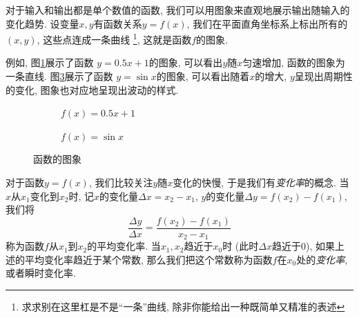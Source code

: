 对于输入和输出都是单个数值的函数,
我们可以用图象来直观地展示输出随输入的变化趋势.
设变量$x,y$有函数关系$y=f(x)$, 我们在平面直角坐标系上标出所有的$(x,y)$,
这些点连成一条曲线
\footnote{
  求求别在这里杠是不是``一条''曲线, 除非你能给出一种既简单又精准的表述\cndots
},
这就是函数$f$的图象.

例如, 图\ref{subfig:fig-test-line}展示了函数
$y=0.5x+1$的图象, 可以看出$y$随$x$匀速增加, 函数的图象为一条直线.
图\ref{subfig:fig-test-sine}展示了函数
$y=\sin{x}$的图象, 可以看出随着$x$的增大,
$y$呈现出周期性的变化, 图象也对应地呈现出波动的样式.

\begin{figure}[htbp]
  \centering
  \begin{subfigure}{0.49\textwidth}
    \centering
    \caption{$f(x) = 0.5x+1$}
    \label{subfig:fig-test-line}
  \end{subfigure}
  \begin{subfigure}{0.49\textwidth}
    \centering
    \caption{$f(x) = \sin{x}$}
    \label{subfig:fig-test-sine}
  \end{subfigure}
  \caption{函数的图象}
\end{figure}

对于函数$y=f(x)$, 我们比较关注$y$随$x$变化的快慢,
于是我们有\emph{变化率}的概念.
当$x$从$x_1$变化到$x_2$时, 记$x$的变化量$\Delta{x}=x_2-x_1$,
$y$的变化量$\Delta{y}=f(x_2)-f(x_1)$,
我们将
$$
  \dfrac{\Delta{y}}{\Delta{x}} =
  \dfrac{f(x_2)-f(x_1)}{x_2-x_1}
$$
称为函数$f$从$x_1$到$x_2$的平均变化率.
当$x_1,x_2$趋近于$x_0$时 (此时$\Delta{x}$趋近于0),
如果上述的平均变化率趋近于某个常数,
那么我们把这个常数称为函数$f$在$x_0$处的\emph{变化率},
或者瞬时变化率.

